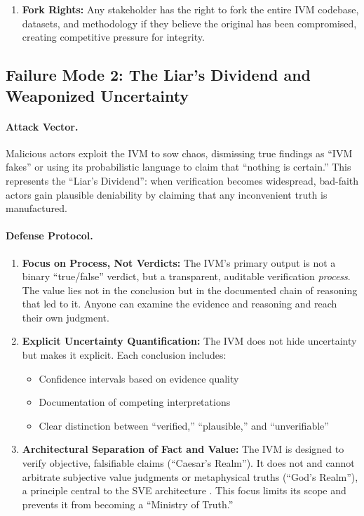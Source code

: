 \documentclass[11pt,a4paper]{article}
\begin{document}
\begin{small}
\begin{enumerate}
    \item \textbf{Fork Rights:} Any stakeholder has the right to fork the entire IVM codebase, datasets, and methodology if they believe the original has been compromised, creating competitive pressure for integrity.
\end{enumerate}

\subsection{Failure Mode 2: The Liar's Dividend and Weaponized Uncertainty}

\paragraph{Attack Vector.} Malicious actors exploit the IVM to sow chaos, dismissing true findings as ``IVM fakes'' or using its probabilistic language to claim that ``nothing is certain.'' This represents the ``Liar's Dividend'': when verification becomes widespread, bad-faith actors gain plausible deniability by claiming that any inconvenient truth is manufactured.

\paragraph{Defense Protocol.}

\begin{enumerate}
    \item \textbf{Focus on Process, Not Verdicts:} The IVM's primary output is not a binary ``true/false'' verdict, but a transparent, auditable verification \textit{process}. The value lies not in the conclusion but in the documented chain of reasoning that led to it. Anyone can examine the evidence and reasoning and reach their own judgment.
    
    \item \textbf{Explicit Uncertainty Quantification:} The IVM does not hide uncertainty but makes it explicit. Each conclusion includes:
    \begin{itemize}
        \item Confidence intervals based on evidence quality
        \item Documentation of competing interpretations
        \item Clear distinction between ``verified,'' ``plausible,'' and ``unverifiable''
    \end{itemize}
    
    \item \textbf{Architectural Separation of Fact and Value:} The IVM is designed to verify objective, falsifiable claims (``Caesar's Realm''). It does not and cannot arbitrate subjective value judgments or metaphysical truths (``God's Realm''), a principle central to the SVE architecture \citep{Kovnatsky2025SVE2}. This focus limits its scope and prevents it from becoming a ``Ministry of Truth.''
    

\end{enumerate}
\end{small}
\end{document}
